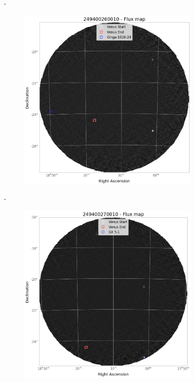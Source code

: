 \documentclass[
	a4paper, %
	10pt, %
	unnumberedsections, %
	twoside, %
]{LTJournalArticle}
\begin{document}
\begin{figure}[H]
\begin{subfigure}{.3\textwidth}
        \end{subfigure}
        \hspace{1em}-
        \begin{subfigure}{.3\textwidth}
            \centering
            \includegraphics[width=\textwidth]{report/Figures/methods/2204/26_map.png}
        \end{subfigure}
        \hspace{1em}-
        \begin{subfigure}{.3\textwidth}
            \centering
            \includegraphics[width=\textwidth]{report/Figures/methods/2204/27_map.png}

\end{subfigure}
\end{figure}
\end{document}
